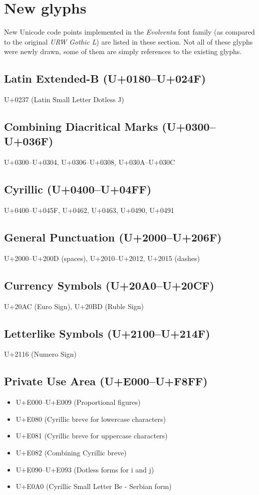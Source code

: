 \documentclass[a4paper,12pt,oneside,extrafontsizes]{memoir}
\begin{document}
\section{New glyphs}

New Unicode code points implemented in the \emph{Evolventa} font family (as compared to the original \emph{URW Gothic L}) are listed in these section. Not all of these glyphs were newly drawn, some of them are simply references to the existing glyphs.

\subsection{Latin Extended-B (U+0180--U+024F)}
U+0237 (Latin Small Letter Dotless J)

\subsection{Combining Diacritical Marks (U+0300--U+036F)}
U+0300--U+0304, U+0306--U+0308, U+030A--U+030C

\subsection{Cyrillic (U+0400--U+04FF)}
U+0400--U+045F, U+0462, U+0463, U+0490, U+0491

\subsection{General Punctuation (U+2000--U+206F)}
U+2000--U+200D (spaces), U+2010--U+2012, U+2015 (dashes)

\subsection{Currency Symbols (U+20A0--U+20CF)}
U+20AC (Euro Sign), U+20BD (Ruble Sign)

\subsection{Letterlike Symbols (U+2100--U+214F)}
U+2116 (Numero Sign)

\subsection{Private Use Area (U+E000--U+F8FF)}
\begin{itemize}
\item U+E000--U+E009 (Proportional figures)
\item U+E080 (Cyrillic breve for lowercase characters)
\item U+E081 (Cyrillic breve for uppercase characters)
\item U+E082 (Combining Cyrillic breve)
\item U+E090--U+E093 (Dotless forms for i and j)
\item U+E0A0 (Cyrillic Small Letter Be - Serbian form)
\end{itemize}
\end{document}
